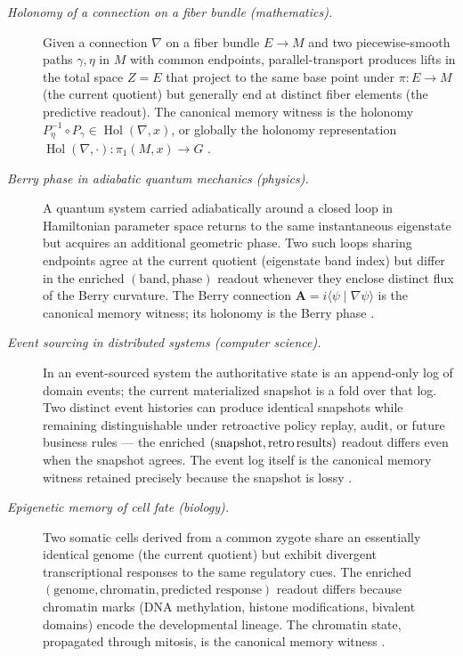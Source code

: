 \documentclass[11pt]{article}
\theoremstyle{definition}
\begin{document}
\begin{description}
\item[\emph{Holonomy of a connection on a fiber bundle
(mathematics).}]
Given a connection \(\nabla\) on a fiber bundle \(E \to M\) and two
piecewise-smooth paths \(\gamma, \eta\) in \(M\) with common
endpoints, parallel-transport produces lifts in the total space
\(Z = E\) that project to the same base point under \(\pi : E \to
M\) (the current quotient) but generally end at distinct fiber
elements (the predictive readout). The canonical memory witness
is the holonomy
\(P_\eta^{-1} \circ P_\gamma \in \operatorname{Hol}(\nabla, x)\),
or globally the holonomy representation
\(\operatorname{Hol}(\nabla, \cdot) : \pi_1(M, x) \to G\)
\citep{KobayashiNomizu1963Foundations}.

\item[\emph{Berry phase in adiabatic quantum mechanics (physics).}]
A quantum system carried adiabatically around a closed loop in
Hamiltonian parameter space returns to the same instantaneous
eigenstate but acquires an additional geometric phase.  Two such
loops sharing endpoints agree at the current quotient (eigenstate
band index) but differ in the enriched
\((\text{band}, \text{phase})\) readout whenever they enclose
distinct flux of the Berry curvature.  The Berry connection
\(\mathbf A = i\langle \psi \mid \nabla \psi\rangle\) is the
canonical memory witness; its holonomy is the Berry phase
\citep{Berry1984QuantalPhase}.

\item[\emph{Event sourcing in distributed systems (computer
science).}]
In an event-sourced system the authoritative state is an
append-only log of domain events; the current materialized snapshot
is a fold over that log.  Two distinct event histories can produce
identical snapshots while remaining distinguishable under
retroactive policy replay, audit, or future business rules — the
enriched \((\text{snapshot}, \text{retro\,results})\) readout
differs even when the snapshot agrees.  The event log itself is the
canonical memory witness retained precisely because the snapshot
is lossy \citep{Kleppmann2017DDIA}.

\item[\emph{Epigenetic memory of cell fate (biology).}]
Two somatic cells derived from a common zygote share an essentially
identical genome (the current quotient) but exhibit divergent
transcriptional responses to the same regulatory cues.  The
enriched
\((\text{genome}, \text{chromatin}, \text{predicted response})\)
readout differs because chromatin marks (DNA methylation, histone
modifications, bivalent domains) encode the developmental lineage.
The chromatin state, propagated through mitosis, is the canonical
memory witness \citep{Reik2007Epigenetic}.


\end{description}
\end{document}
